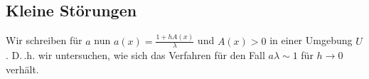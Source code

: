 \subsection*{Kleine Störungen}

Wir schreiben für $a$ nun $a(x) = \frac{1 + h A(x)}{\lambda}$ und $A(x) > 0$ in
einer Umgebung $U$. D.\,.h. wir untersuchen, wie sich das Verfahren für den Fall
$a \lambda \sim 1$ für $h \to 0$ verhält.
